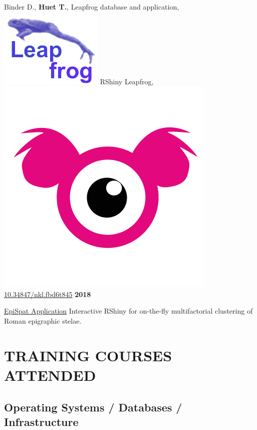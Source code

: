 \documentclass{article}
\newcommand{\fr}[1]{} %
\newcommand{\en}[1]{#1}   %
\begin{document}
\en{Binder D., \textbf{Huet T.}, Leapfrog database and application, \href{https://devr.cepam.cnrs.fr/shinyapps/leap/}{\includegraphics[scale=0.10]{prj_leapfrog-blue.png}} \textsf{RShiny} Leapfrog, \href{https://nakala.fr/10.34847/nkl.fbd6t845}{\includegraphics[scale=0.03]{lod-nakala.png} 10.34847/nkl.fbd6t845}}
\textbf{2018 }
\fr{\href{https://epispat.shinyapps.io/analyses_mult_5/}{Application EpiSpat} \textsf{RShiny} interactive pour le regroupement multifactoriel à la volée des stèles épigraphiques romaines.}
\en{\href{https://epispat.shinyapps.io/analyses_mult_5/}{EpiSpat Application} Interactive \textsf{RShiny} for on-the-fly multifactorial clustering of Roman epigraphic stelae.}
\smallbreak


\section*{\fr{FORMATION SUIVIES}\en{TRAINING COURSES ATTENDED}}

\subsection*{\fr{Systèmes d'exploitation / Bases de données / Infrastructures}\en{Operating Systems / Databases / Infrastructure}}
\end{document}
